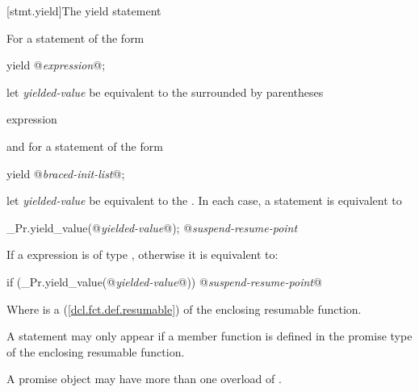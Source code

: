 %

[stmt.yield]{The yield statement}%

\pnum
For a  statement of the form

\begin{codeblock}
  yield @\textit{expression}@;
\end{codeblock}

let \textit{yielded-value} be equivalent to the  surrounded
by parentheses

\begin{ncbnf}
  \terminal{(} expression \terminal{)}
\end{ncbnf}

and for a  statement of the form

\begin{codeblock}
  yield @\textit{braced-init-list}@;
\end{codeblock}

let \textit{yielded-value} be equivalent to the . In each case,
a  statement is equivalent to

\begin{codeblock}
  _Pr.yield_value(@\textit{yielded-value}@);
  @\textit{suspend-resume-point}
\end{codeblock}

If a  expression is of type , otherwise it is equivalent to:

\begin{codeblock}
  if (_Pr.yield_value(@\textit{yielded-value}@)) {
    @\textit{suspend-resume-point}@
  }
\end{codeblock}

Where  is a  (\ref{dcl.fct.def.resumable}) of the enclosing resumable function.

\pnum
A  statement may only appear if a  member
function is defined in the promise type of the enclosing resumable function.

\pnum
A promise object may have more than one overload of .

